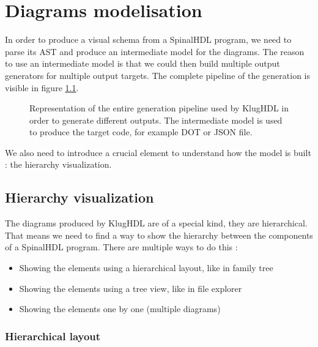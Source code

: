 \chapter{Diagrams modelisation}

In order to produce a visual schema from a SpinalHDL program, we need to parse
its AST and produce an intermediate model for the diagrams. The reason to use
an intermediate model is that we could then build multiple output generators
for multiple output targets. The complete pipeline of the generation is visible
in figure \ref{fig:generation-pipeline}.

\begin{figure}[H]
    \centering
    \caption[KlugHDL generation pipeline]{Representation of the entire generation
      pipeline used by KlugHDL in order to generate different outputs. The
      intermediate model is used to produce the target code, for example DOT or
      JSON file.}
    \label{fig:generation-pipeline}
\end{figure}

We also need to introduce a crucial element to understand how the model is
built : the hierarchy visualization.

\section{Hierarchy visualization}

The diagrams produced by KlugHDL are of a special kind, they are hierarchical.
That means we need to find a way to show the hierarchy between the components
of a SpinalHDL program. There are multiple ways to do this :
\begin{itemize}
  \item Showing the elements using a hierarchical layout, like in family tree
  \item Showing the elements using a tree view, like in file explorer
  \item Showing the elements one by one (multiple diagrams)
\end{itemize}

\subsection{Hierarchical layout}
\label{sec:hierarchical-layout}

